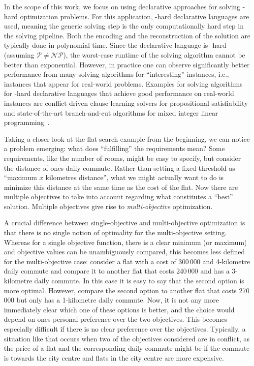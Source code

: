 In the scope of this work, we focus on using declarative approaches for solving \NP-hard optimization problems.
For this application, \NP-hard declarative languages are used, meaning the generic solving step is the only computationally hard step in the solving pipeline.
Both the encoding and the reconstruction of the solution are typically done in polynomial time.
Since the declarative language is \NP-hard (assuming $\mathcal{P}\neq\mathcal{NP}$), the worst-case runtime of the solving algorithm cannot be better than exponential.
However, in practice one can observe significantly better performance from many solving algorithms for ``interesting'' instances, i.e., instances that appear for real-world problems.
Examples for solving algorithms for \NP-hard declarative languages that achieve good performance on real-world instances are conflict driven clause learning solvers for propositional satisfiability~\autocite{handbook2-cdcl} and state-of-the-art branch-and-cut algorithms for mixed integer linear programming~\autocite{ChenEtAl2010-branch-and-cut}.

Taking a closer look at the flat search example from the beginning, we can notice a problem emerging:
what does ``fulfilling'' the requirements mean?
Some requirements, like the number of rooms, might be easy to specify, but consider the distance of ones daily commute.
Rather than setting a fixed threshold as ``maximum $x$ kilometres distance'', what we might actually want to do is minimize this distance at the same time as the cost of the flat.
Now there are multiple objectives to take into account regarding what constitutes a ``best'' solution.
Multiple objectives give rise to \emph{multi-objective} optimization.

A crucial difference between single-objective and multi-objective optimization is that there is no single notion of optimality for the multi-objective setting.
Whereas for a single objective function, there is a clear minimum (or maximum) and objective values can be unambiguously compared, this becomes less defined for the multi-objective case:
consider a flat with a cost of 300\,000 \texteuro{} and 4-kilometre daily commute and compare it to another flat that costs 240\,000 \texteuro{} and has a 3-kilometre daily commute.
In this case it is easy to say that the second option is more optimal.
However, compare the second option to another flat that costs 270\,000 \texteuro{} but only has a 1-kilometre daily commute.
Now, it is not any more immediately clear which one of these options is better, and the choice would depend on ones personal preference over the two objectives.
This becomes especially difficult if there is no clear preference over the objectives.
Typically, a situation like that occurs when two of the objectives considered are in conflict, as the price of a flat and the corresponding daily commute might be if the commute is towards the city centre and flats in the city centre are more expensive.

